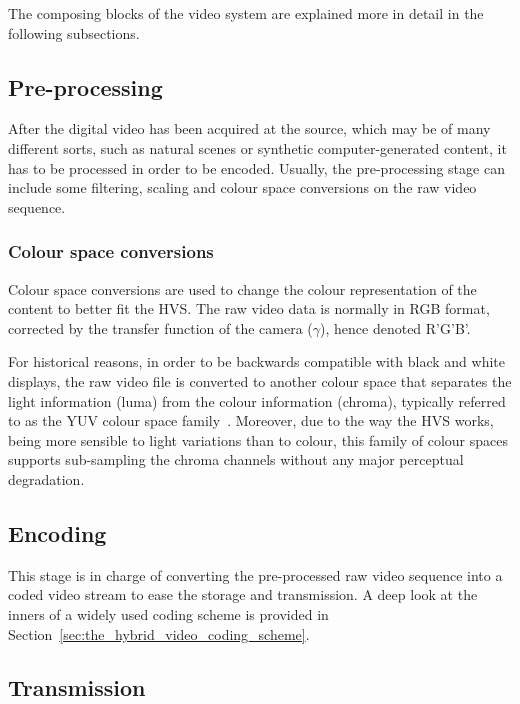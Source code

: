 \documentclass[11pt,a4paper,openright,twoside]{book}
\numberwithin{equation}{section} %
\begin{document}
The composing blocks of the video system are explained more in detail in
the following subsections.

\subsection{Pre-processing}
\label{sub:pre_processing}

After the digital video has been acquired at the source, which may be of
many different sorts, such as natural scenes or synthetic
computer-generated content, it has to be processed in order to be
encoded.
Usually, the pre-processing stage can include some filtering, scaling
and colour space conversions on the raw video sequence.

\subsubsection{Colour space conversions}
\label{ssub:colour_space_conversions}

Colour space conversions are used to change the colour
representation of the content to better fit the \ac{HVS}.
The raw video data is normally in \ac{RGB} format, corrected by the
transfer function of the camera ($\gamma$), hence denoted R'G'B'.

For historical reasons, in order to be backwards compatible with black
and white displays, the raw video file is converted to another colour
space that separates the light information (luma) from the colour
information (chroma), typically referred to as the YUV colour space
family~\cite{poynton-95-color-space}.
Moreover, due to the way the \ac{HVS} works, being more sensible to
light variations than to colour, this family of colour spaces supports
sub-sampling the chroma channels without any major perceptual
degradation.

\subsection{Encoding}
\label{sub:encoding}

This stage is in charge of converting the pre-processed raw video sequence
into a coded video stream to ease the storage and transmission.
A deep look at the inners of a widely used coding scheme is provided
in Section~\ref{sec:the_hybrid_video_coding_scheme}.

\subsection{Transmission}
\label{sub:transmission}
\end{document}
